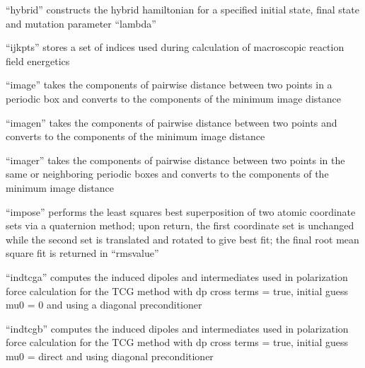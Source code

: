 \documentclass[letterpaper,11pt,english]{sphinxmanual}
\begin{document}
\sphinxAtStartPar
“hybrid” constructs the hybrid hamiltonian for a specified initial state, final state and mutation parameter “lambda”

\sphinxAtStartPar
{}

\sphinxAtStartPar
“ijkpts” stores a set of indices used during calculation of macroscopic reaction field energetics

\sphinxAtStartPar
{}

\sphinxAtStartPar
“image” takes the components of pairwise distance between two points in a periodic box and converts to the components of the minimum image distance

\sphinxAtStartPar
{}

\sphinxAtStartPar
“imagen” takes the components of pairwise distance between two points and converts to the components of the minimum image distance

\sphinxAtStartPar
{}

\sphinxAtStartPar
“imager” takes the components of pairwise distance between two points in the same or neighboring periodic boxes and converts to the components of the minimum image distance

\sphinxAtStartPar
{}

\sphinxAtStartPar
“impose” performs the least squares best superposition of two atomic coordinate sets via a quaternion method; upon return, the first coordinate set is unchanged while the second set is translated and rotated to give best fit; the final root mean square fit is returned in “rmsvalue”

\sphinxAtStartPar
{}

\sphinxAtStartPar
“indtcga” computes the induced dipoles and intermediates used in polarization force calculation for the TCG method with dp cross terms = true, initial guess mu0 = 0 and using a diagonal preconditioner

\sphinxAtStartPar
{}

\sphinxAtStartPar
“indtcgb” computes the induced dipoles and intermediates used in polarization force calculation for the TCG method with dp cross terms = true, initial guess mu0 = direct and using diagonal preconditioner

\sphinxAtStartPar
{}
\end{document}
